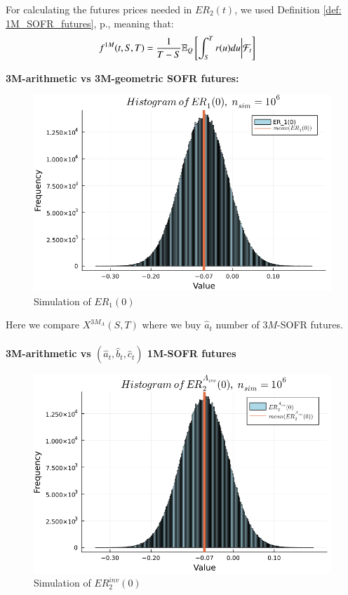 For calculating the futures prices needed in $ER_{2}(t)$, we used Definition \ref{def: 1M_SOFR_futures}, p.\pageref{def: 1M_SOFR_futures}, meaning that: 
\begin{align*}
f^{1M}(t,S,T) &= \frac{1}{T-S}\mathbb{E}_{Q}\left[
\int_{S}^{T}r(u)du\bigg{|}\mathcal{F}_{t}
\right]   
\end{align*}

\newpage 

\textbf{3M-arithmetic vs 3M-geometric SOFR futures:}

\begin{figure}[htp]
    \centering
    \includegraphics[width=12cm]{figures/SOFR/ER_1(0).PNG}
    \caption{Simulation of $ER_{1}(0)$}
    \label{fig: ER_1_(0)}
\end{figure}

Here we compare $X^{3M_{A}}(S,T)$ where we buy $\hat{a}_{t}$ number of $3M$-SOFR futures.
\\~\\
\textbf{3M-arithmetic vs $(\hat{a}_{t}, \hat{b}_{t}, \hat{c}_{t})$ 1M-SOFR futures}

\begin{figure}[htp]
    \centering
    \includegraphics[width=12cm]{figures/SOFR/ER_2(0)_A_inv.PNG}
    \caption{Simulation of $ER_{2}^{inv}(0)$}
    \label{fig: ER_2_(0)_A_inv}
\end{figure}

